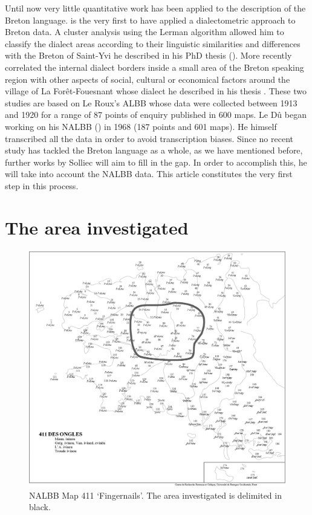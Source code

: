 \documentclass[output=paper]{LSP/langsci}
\begin{document}
Until now very little quantitative work has been applied to the description of the Breton language. \citet{german_etude_1984,german_methode_1991} is the very first to have applied a dialectometric approach to Breton data. A cluster analysis using the Lerman algorithm allowed him to classify the dialect areas according to their linguistic similarities and differences with the Breton of Saint-Yvi he described in his PhD thesis (\citeyear{german_etude_1984}). More recently \citet{costaouec_linguistic_2012} correlated the internal dialect borders inside a small area of the Breton speaking region with other aspects of social, cultural or economical factors around the village of La Forêt-Fouesnant whose dialect he described in his thesis \citet{costaouec_breton_1998}. These two studies are based on Le Roux’s ALBB whose data were collected between 1913 and 1920 for a range of 87 points of enquiry published in 600 maps. Le Dû began working on his NALBB (\citeyear{le_du_nouvel_2001}) in 1968 (187 points and 601 maps). He himself transcribed all the data in order to avoid transcription biases. Since no recent study has tackled the Breton language as a whole, as we have mentioned before, further works by Solliec will aim to fill in the gap. In order to accomplish this, he will take into account the NALBB data. This article constitutes the very first step in this process.

\section{The area investigated}

\begin{figure}
\includegraphics[width=\textwidth]{illustrations/brun_etal_fig2}
\caption{NALBB Map 411 ‘Fingernails’. The area investigated is delimited in black.}
\end{figure}
\end{document}
